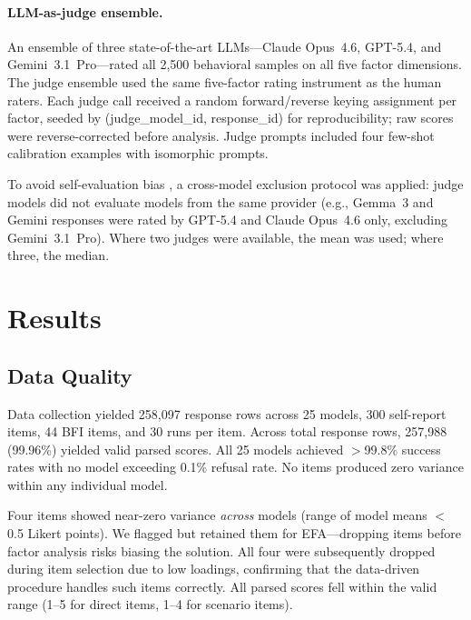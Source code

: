 \documentclass[11pt]{article}
\newcommand{\nmodels}{25}
\newcommand{\nitems}{300}
\newcommand{\nruns}{30}
\newcommand{\nbehavioralsamples}{2{,}500}
\begin{document}
\paragraph{LLM-as-judge ensemble.}
An ensemble of three state-of-the-art LLMs---Claude Opus~4.6, GPT-5.4, and Gemini~3.1~Pro---rated all \nbehavioralsamples{} behavioral samples on all five factor dimensions.
The judge ensemble used the same five-factor rating instrument as the human raters.
Each judge call received a random forward/reverse keying assignment per factor, seeded by (judge\_model\_id, response\_id) for reproducibility; raw scores were reverse-corrected before analysis.
Judge prompts included four few-shot calibration examples with isomorphic prompts.

To avoid self-evaluation bias \citep{zheng2023judging}, a cross-model exclusion protocol was applied: judge models did not evaluate models from the same provider (e.g., Gemma~3 and Gemini responses were rated by GPT-5.4 and Claude Opus~4.6 only, excluding Gemini~3.1~Pro).
Where two judges were available, the mean was used; where three, the median.




\section{Results}
\label{sec:results}

\subsection{Data Quality}
\label{sec:data-quality}

Data collection yielded 258{,}097 response rows across \nmodels{} models, \nitems{} self-report items, 44 BFI items, and \nruns{} runs per item.
Across total response rows, 257{,}988 (99.96\%) yielded valid parsed scores. All 25 models achieved $>$99.8\% success rates with no model exceeding 0.1\% refusal rate.
No items produced zero variance within any individual model.

Four items showed near-zero variance \emph{across} models (range of model means $<$ 0.5 Likert points). We flagged but retained them for EFA---dropping items before factor analysis risks biasing the solution.
All four were subsequently dropped during item selection due to low loadings, confirming that the data-driven procedure handles such items correctly.
All parsed scores fell within the valid range (1--5 for direct items, 1--4 for scenario items).
\end{document}
